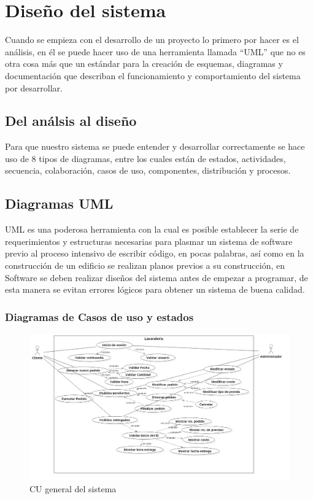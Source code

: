 \section{Diseño del sistema}
Cuando se empieza con el desarrollo de un proyecto lo primero por hacer es el análisis, en él se puede hacer uso de una herramienta llamada “UML” que no es otra cosa más que un estándar para la creación de esquemas, diagramas y documentación que describan el funcionamiento y comportamiento del sistema por desarrollar.
\subsection{Del análsis al diseño}
Para que nuestro sistema se puede entender y desarrollar correctamente se hace uso de 8 tipos de diagramas, entre los cuales están de estados, actividades, secuencia, colaboración, casos de uso, componentes, distribución y procesos.
\subsection{Diagramas UML}
UML es una poderosa herramienta con la cual es posible establecer la serie de requerimientos y estructuras necesarias para plasmar un sistema de software previo al proceso intensivo de escribir código, en pocas palabras, así como en la construcción de un edificio se realizan planos previos a su construcción, en Software se deben realizar diseños del sistema antes de empezar a programar, de esta manera se evitan errores lógicos para obtener un sistema de buena calidad.

\newpage
\subsubsection{Diagramas de Casos de uso y estados}


\begin{figure}[htb]
\begin{center}
\includegraphics[width=14cm]{./imagenes/diagramas/CU_Lavanderia.png}
\end{center}
\caption{CU general del sistema}
\end{figure}


